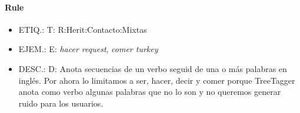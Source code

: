 \documentclass[11pt]{report}
\begin{document}
\paragraph*{Rule}
\begin{itemize}
\item ETIQ.:  T: R:Herit:Contacto:Mixtas
\item EJEM.:  E: \emph{hacer request}, \emph{comer turkey}
\item DESC.:  D: Anota secuencias de un verbo seguid de una o más palabras en inglés. Por ahora lo limitamos a ser, hacer, decir y comer porque TreeTagger anota como verbo algunas palabras que no lo son y no queremos generar ruido para los usuarios.
\end{itemize}
\end{document}
